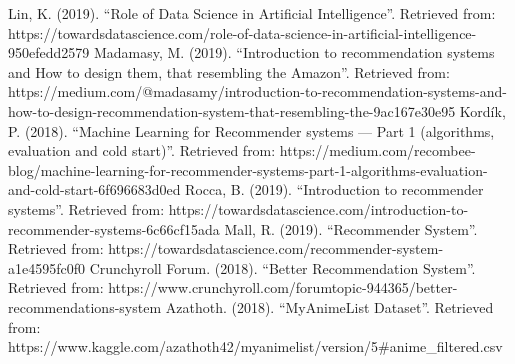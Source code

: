 \documentclass[conference]{IEEEtran}
\begin{document}
\begin{thebibliography}{00}
 Lin, K. (2019). “Role of Data Science in Artificial Intelligence”. Retrieved from: https://towardsdatascience.com/role-of-data-science-in-artificial-intelligence-950efedd2579
 Madamasy, M. (2019). “Introduction to recommendation systems and How to design them, that resembling the Amazon”. Retrieved from: https://medium.com/@madasamy/introduction-to-recommendation-systems-and-how-to-design-recommendation-system-that-resembling-the-9ac167e30e95
 Kordík, P. (2018). “Machine Learning for Recommender systems — Part 1 (algorithms, evaluation and cold start)”. Retrieved from: https://medium.com/recombee-blog/machine-learning-for-recommender-systems-part-1-algorithms-evaluation-and-cold-start-6f696683d0ed
 Rocca, B. (2019). “Introduction to recommender systems”. Retrieved from: https://towardsdatascience.com/introduction-to-recommender-systems-6c66cf15ada
 Mall, R. (2019). “Recommender System”. Retrieved from: https://towardsdatascience.com/recommender-system-a1e4595fc0f0
 Crunchyroll Forum. (2018). “Better Recommendation System”. Retrieved from: https://www.crunchyroll.com/forumtopic-944365/better-recommendations-system
 Azathoth. (2018). “MyAnimeList Dataset”. Retrieved from: https://www.kaggle.com/azathoth42/myanimelist/version/5\#anime\_filtered.csv

\end{thebibliography}
\end{document}
